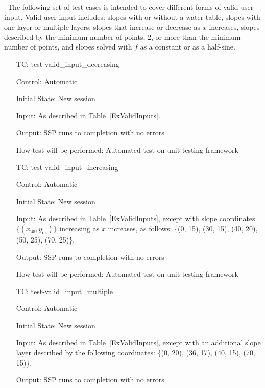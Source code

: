 \documentclass[12pt, titlepage]{article}
\newcounter{testnum} %
\newcommand{\progname}{SSP}
\begin{document}
~\newline \noindent The following set of test cases is intended to cover 
different forms of valid user input. Valid user input includes: slopes with or 
without a water table, slopes with one layer or multiple layers, slopes that 
increase or decrease as $x$ increases, slopes described by the minimum number 
of points, 2, or more than the minimum number of points, and slopes solved with 
$f$ as a constant or as a half-sine.

\begin{enumerate}[label=TC\arabic*:,ref={\arabic*}]

\item [TC\refstepcounter{testnum}\thetestnum: \label{TC_ValidInDec}] 
test-valid\_input\_decreasing

Control: Automatic
					
Initial State: New session
					
Input: As described in Table~\ref{ExValidInputs}.
					
Output: \progname{} runs to completion with no errors

How test will be performed: Automated test on unit testing framework
					
\item [TC\refstepcounter{testnum}\thetestnum: \label{TC_ValidInInc}] 
test-valid\_input\_increasing

Control: Automatic

Initial State: New session

Input: As described in Table~\ref{ExValidInputs}, except with slope coordinates 
$\{\left(x_\text{us},y_\text{us}\right)\}$ increasing as $x$ increases, as 
follows: \{(0, 
15), (30, 15), (40, 20), (50, 25), (70, 25)\}.

Output: \progname{} runs to completion with no errors

How test will be performed: Automated test on unit testing framework

\item [TC\refstepcounter{testnum}\thetestnum: \label{TC_ValidInMultiple}] 
test-valid\_input\_multiple

Control: Automatic

Initial State: New session

Input: As described in Table~\ref{ExValidInputs}, except with an additional 
slope layer described by the following coordinates: \{(0, 20), (36, 17), (40, 
15), (70, 15)\}.

Output: \progname{} runs to completion with no errors


\end{enumerate}
\end{document}
